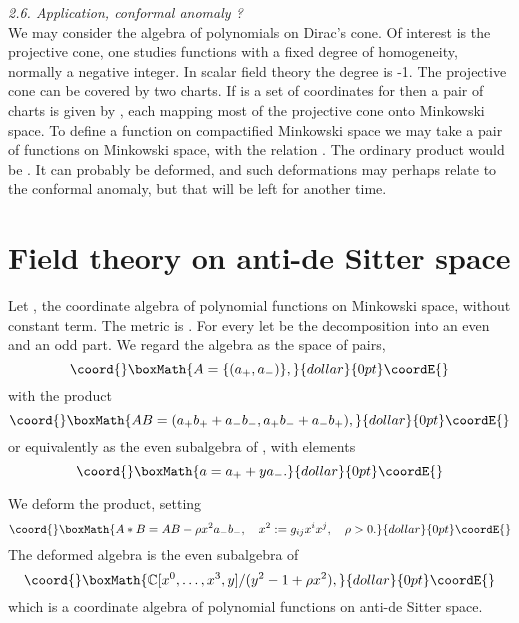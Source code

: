 \documentclass[a4paper,a4paper]{article}
\begin{document}
\smallskip

\noindent\textit{2.6. Application, conformal anomaly ?} \\
We may consider the algebra of polynomials on Dirac's cone.  Of interest is 
the projective cone, one studies functions with a fixed degree of 
homogeneity, normally a negative integer. In scalar field theory the degree
is -1.  The projective cone can be covered by two charts. If \coordHE{} is a set 
of coordinates for \coordHE{} then a pair of  charts is given by 
\coordHE{},
each mapping most of the projective cone onto Minkowski space. To define a
function on compactified Minkowski space we may take a pair of functions on
Minkowski space, with the relation \coordHE{}.
The ordinary product would be \coordHE{}.
It can probably be deformed, and such deformations may perhaps relate to the
conformal anomaly, but that will be left for another time.

\section{Field theory on  anti-de Sitter space}  %

Let \coordHE{}, the coordinate algebra of 
polynomial functions on %
Minkowski space, without constant term. The metric 
is \coordHE{}.
For every \coordHE{} let \coordHE{} be the decomposition into
an even and an odd part. We regard the algebra as the space of pairs,
$$\coord{}\boxMath{
A = \{(a_+,a_-)\},
}{dollar}{0pt}\coordE{}$$ with the product
$$\coord{}\boxMath{
AB = (a_+b_+ + a_-b_-, a_+b_- + a_-b_+),
}{dollar}{0pt}\coordE{}$$
or equivalently as the even subalgebra of  
\coordHE{}, with elements
$$\coord{}\boxMath{
a = a_+ + ya_-.
}{dollar}{0pt}\coordE{}$$

We deform the product, setting
$$\coord{}\boxMath{
A*B = AB - \rho x^2a_-b_-,\quad x^2 := g_{ij}x^ix^j,\quad \rho > 0.
}{dollar}{0pt}\coordE{}$$
The deformed algebra is the even subalgebra of
$$\coord{}\boxMath{
\mathbb{C}[x^0,\ldots,x^3,y]/(y^2-1+\rho x^2),
}{dollar}{0pt}\coordE{}$$ which is a coordinate algebra  of polynomial functions on 
anti-de Sitter space.
\end{document}
